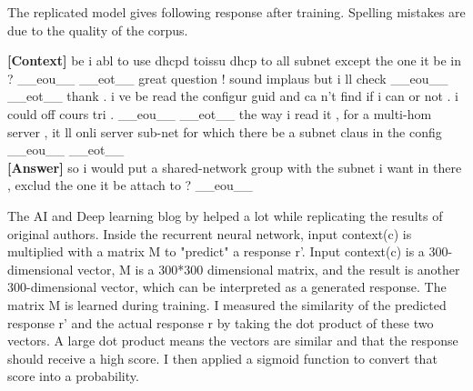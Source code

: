 \documentclass[letterpaper] {article} %
\begin{document}
The replicated model gives following response after training. Spelling mistakes are due to the quality of the corpus.
\begin{tcolorbox}
     \textbf{[Context]} be i abl to use dhcpd toissu dhcp to all subnet except the one it be in ? \_\_eou\_\_ \_\_eot\_\_ great question ! sound implaus but i ll check \_\_eou\_\_ \_\_eot\_\_ thank . i ve be read the configur guid and ca n't find if i can or not . i could off cours tri . \_\_eou\_\_ \_\_eot\_\_ the way i read it , for a multi-hom server , it ll onli server sub-net for which there be a subnet { } claus in the config \_\_eou\_\_ \_\_eot\_\_ \\
     \textbf{[Answer]} so i would put a shared-network group with the subnet i want in there , exclud the one it be attach to ? \_\_eou\_\_
\end{tcolorbox}
The AI and Deep learning blog by \cite{DENNYBRITZ} helped a lot while replicating the results of original authors. Inside the recurrent neural network, input context(c) is multiplied with a matrix M to "predict" a response r'. Input context(c) is a 300-dimensional vector, M is a 300*300 dimensional matrix, and the result is another 300-dimensional vector, which can be interpreted as a generated response. The matrix M is learned during training. I measured the similarity of the predicted response r' and the actual response r by taking the dot product of these two vectors. A large dot product means the vectors are similar and that the response should receive a high score. I then applied a sigmoid function to convert that score into a probability.
\end{document}
